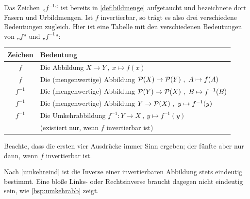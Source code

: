 \begin{bem}
    Das Zeichen „$f^{-1}$“ ist bereits in \cref{def:bildmenge} aufgetaucht und bezeichnete dort Fasern und Urbildmengen. Ist $f$ invertierbar, so trägt es also drei verschiedene Bedeutungen zugleich. Hier ist eine Tabelle mit den verschiedenen Bedeutungen von „$f$“ und „$f^{-1}$“:
    \begin{center}
    \begin{tabular}{cl}
        Zeichen & Bedeutung \\
        \midrule
        $f$ & Die Abbildung $X \to Y \ ,\ x \mapsto f(x)$ \\
        $f$ & Die (mengenwertige) Abbildung $\mathcal P(X) \to \mathcal P(Y) \ ,\ A\mapsto f(A)$  \\
        $f^{-1}$ & Die (mengenwertige) Abbildung $\mathcal P(Y) \to \mathcal P(X) \ ,\ B\mapsto f^{-1}(B)$ \\
        $f^{-1}$ & Die (mengenwertige) Abbildung $Y \to \mathcal P(X) \ ,\ y\mapsto f^{-1}(y)$ \\
        \midrule
        $f^{-1}$ & Die Umkehrabbildung $f^{-1} : Y\to X \ ,\ y \mapsto f^{-1}(y)$ \\
        & (existiert nur, wenn $f$ invertierbar ist)
    \end{tabular}
    \end{center}
    Beachte, dass die ersten vier Ausdrücke immer Sinn ergeben; der fünfte aber nur dann, wenn $f$ invertierbar ist.
\end{bem}


\begin{bem}
    Nach \cref{umkehreind} ist die Inverse einer invertierbaren Abbildung stets eindeutig bestimmt. Eine bloße Links- oder Rechtsinverse braucht dagegen nicht eindeutig sein, wie \cref{bsp:umkehrabb} zeigt.
\end{bem}


